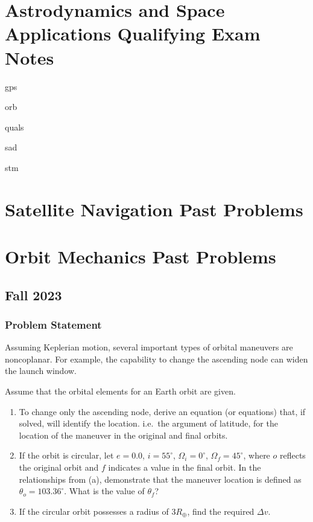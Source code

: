 \documentclass[
]{article}
\author{}
\date{}
\let\oldsection\section
\renewcommand\section{\clearpage\oldsection}
\providecommand{\tightlist}{%
  \setlength{\itemsep}{0pt}\setlength{\parskip}{0pt}}
\begin{document}
\section{Astrodynamics and Space Applications Qualifying Exam
Notes}\label{astrodynamics-and-space-applications-qualifying-exam-notes}

gps

orb

quals

sad

stm

\section{Satellite Navigation Past
Problems}\label{satellite-navigation-past-problems}

\section{Orbit Mechanics Past
Problems}\label{orbit-mechanics-past-problems}

\subsection{Fall 2023}\label{fall-2023}

\subsubsection{Problem Statement}\label{problem-statement}

Assuming Keplerian motion, several important types of orbital maneuvers
are noncoplanar. For example, the capability to change the ascending
node can widen the launch window.

Assume that the orbital elements for an Earth orbit are given.

\begin{enumerate}
\tightlist
\item
  To change only the ascending node, derive an equation (or equations)
  that, if solved, will identify the location. i.e.~the argument of
  latitude, for the location of the maneuver in the original and final
  orbits.
\item
  If the orbit is circular, let \(e=0.0\), \(i=55^\circ\),
  \(\Omega_i=0^\circ\), \(\Omega_f=45^\circ\), where \(o\) reflects the
  original orbit and \(f\) indicates a value in the final orbit. In the
  relationships from (a), demonstrate that the maneuver location is
  defined as \(\theta_o = 103.36^\circ\). What is the value of
  \(\theta_f\)?
\item
  If the circular orbit possesses a radius of \(3R_\oplus\), find the
  required \(\Delta v\).
\end{enumerate}
\end{document}
